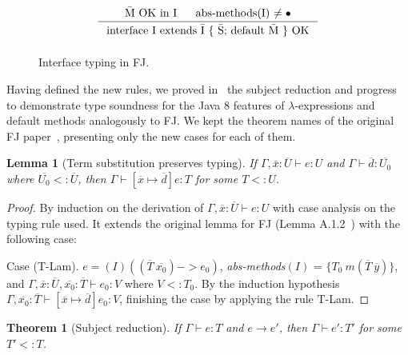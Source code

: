 \documentclass[tese,capa,english]{texufpel}
\newtheorem{theorem}{Theorem}
\newtheorem{lemma}{Lemma}
\begin{document}
\begin{figure}[!htb]
\[
\begin{array}{c} 
\inference{\textrm{\={M} OK in I \ \ \ \ abs-methods(I) $\neq \bullet$}}
          {\textrm{interface I extends \={I} \{ \={S}; default \={M} \} OK}}
\vspace{5pt}
\end{array}
\]
\caption{Interface typing in FJ.}
\label{fig:fje-ityping}
\end{figure}

Having defined the new rules, we proved in~\cite{feitosa2018-3} the subject reduction and progress to demonstrate type soundness for the Java 8 features of $\lambda$-expressions and default methods analogously to FJ. We kept the theorem names of the original FJ paper~\cite{Igarashi:2001:FJM:503502.503505}, presenting only the new cases for each of them.

\begin{lemma}[Term substitution preserves typing]
\label{lem:fje-subs}
	\label{lem:subs}
	If $\Gamma, \overline{x} : \overline{U} \vdash e : U$ and $\Gamma \vdash \overline{d} : \overline{U_0}$ where $\overline{U_0} <: \overline{U}$, then $\Gamma \vdash [\overline{x} \mapsto \overline{d}]e : T$ for some $T <: U$.
\end{lemma}

\begin{proof}
  By induction on the derivation of $\Gamma, \overline{x} : \overline{U} \vdash e : U$ with case analysis on the typing rule used. It extends the original lemma for FJ (Lemma A.1.2~\cite{Igarashi:2001:FJM:503502.503505}) with the following case:
  
\vspace{5pt}
  
Case (T-Lam). $e = (I)((\overline{T} ~ \overline{x_0}) -> e_0)$, \emph{abs-methods}$(I)$ = $\{T_0 ~ m(\overline{T} ~ \overline{y})\}$, and $\Gamma, \overline{x} : \overline{U}, \overline{x_0} : \overline{T} \vdash e_0 : V$ where $V <: T_0$. By the induction hypothesis $\Gamma, \overline{x_0} : \overline{T} \vdash [\overline{x} \mapsto \overline{d}]e_0 : V$, finishing the case by applying the rule T-Lam.
\end{proof}

\begin{theorem}[Subject reduction]
	\label{th:preservation}
	If $\Gamma \vdash e : T$ and $e \rightarrow e'$, then $\Gamma \vdash e' : T'$ for some $T' <: T$.
\end{theorem}
\end{document}
